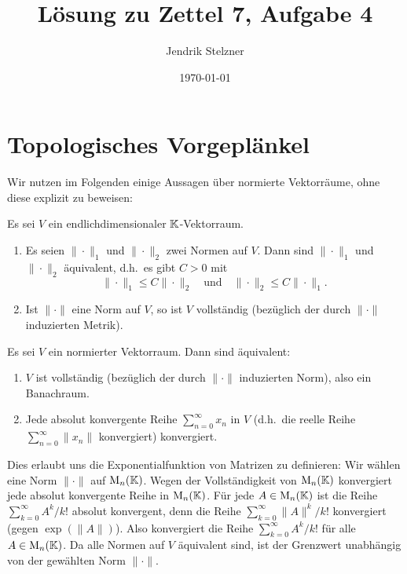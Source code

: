 \documentclass[a4paper, 10pt]{article}
\title{Lösung zu Zettel 7, Aufgabe 4}
\author{Jendrik Stelzner}
\date{\today}
\begin{document}
\maketitle





\section{Topologisches Vorgeplänkel}
Wir nutzen im Folgenden einige Aussagen über normierte Vektorräume, ohne diese explizit zu beweisen:

\begin{lemma}
  Es sei $V$ ein endlichdimensionaler $\mathbb{K}$-Vektorraum.
  \begin{enumerate}[leftmargin=*]
    \item
      Es seien $\|\cdot\|_1$ und $\|\cdot\|_2$ zwei Normen auf $V$.
      Dann sind $\|\cdot\|_1$ und $\|\cdot\|_2$ äquivalent, d.h.\ es gibt $C > 0$ mit
      \[
        \|\cdot\|_1 \leq C \|\cdot\|_2
        \quad\text{und}\quad
        \|\cdot\|_2 \leq C \|\cdot\|_1.
      \]
    \item
      Ist $\|\cdot\|$ eine Norm auf $V$, so ist $V$ vollständig (bezüglich der durch $\|\cdot\|$ induzierten Metrik).
  \end{enumerate}
\end{lemma}

\begin{lemma}
  Es sei $V$ ein normierter Vektorraum.
  Dann sind äquivalent:
  \begin{enumerate}
    \item
      $V$ ist vollständig (bezüglich der durch $\|\cdot\|$ induzierten Norm), also ein Banachraum.
    \item
      Jede absolut konvergente Reihe $\sum_{n=0}^\infty x_n$ in $V$ (d.h.\ die reelle Reihe $\sum_{n=0}^\infty \|x_n\|$ konvergiert) konvergiert.
  \end{enumerate}
\end{lemma}


Dies erlaubt uns die Exponentialfunktion von Matrizen zu definieren:
Wir wählen eine Norm $\|\cdot\|$ auf $\operatorname{M}_n(\mathbb{K})$.
Wegen der Vollständigkeit von $\operatorname{M}_n(\mathbb{K})$ konvergiert jede absolut konvergente Reihe in $\operatorname{M}_n(\mathbb{K})$.
Für jede $A \in \operatorname{M}_n(\mathbb{K})$ ist die Reihe $\sum_{k=0}^\infty A^k/k!$ absolut konvergent, denn die Reihe $\sum_{k=0}^\infty \|A\|^k/k!$ konvergiert (gegen $\exp(\|A\|)$).
Also konvergiert die Reihe $\sum_{k=0}^\infty A^k/k!$ für alle $A \in \operatorname{M}_n(\mathbb{K})$.
Da alle Normen auf $V$ äquivalent sind, ist der Grenzwert unabhängig von der gewählten Norm $\|\cdot\|$.
\end{document}
